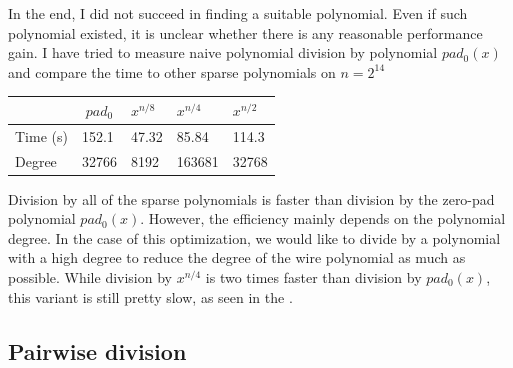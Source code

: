 In the end, I did not succeed in finding a suitable polynomial. Even if such polynomial existed, it is unclear whether there is any reasonable performance gain. I have tried to measure naive polynomial division by polynomial $pad_0(x)$ and compare the time to other sparse polynomials on $n = 2^{14}$

\begin{table}[H]
    \centering
    \begin{tabular}{|l|l|l|l|l|}
    \hline
             & \multicolumn{1}{c|}{$pad_0$} & $x^{n/8}$ & $x^{n/4}$ & $x^{n/2}$ \\ \hline
    Time (s) & 152.1                        & 47.32     & 85.84     & 114.3     \\ \hline
    Degree   & 32766                        & 8192      & 163681    & 32768     \\ \hline
    \end{tabular}
\end{table}

Division by all of the sparse polynomials is faster than division by the zero-pad polynomial $pad_0(x)$. However, the efficiency mainly depends on the polynomial degree. In the case of this optimization, we would like to divide by a polynomial with a high degree to reduce the degree of the wire polynomial as much as possible. While division by $x^{n/4}$ is two times faster than division by $pad_0(x)$, this variant is still pretty slow, as seen in the .

\subsection{Pairwise division}
\begin{pchstack}
    \label{pairwise-div}
\end{pchstack}


